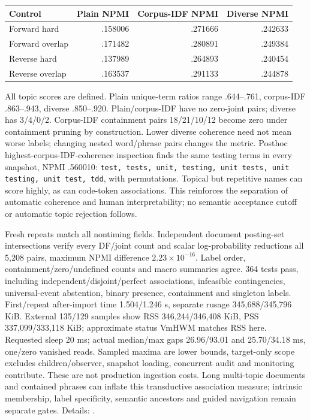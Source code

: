\documentclass[11pt]{article}
\begin{document}
\begin{center}\small
\begin{tabular}{lrrr}
\toprule
Control & Plain NPMI & Corpus-IDF NPMI & Diverse NPMI\\
\midrule
Forward hard & .158006 & .271666 & .242633\\
Forward overlap & .171482 & .280891 & .249384\\
Reverse hard & .137989 & .264893 & .240454\\
Reverse overlap & .163537 & .291133 & .244878\\
\bottomrule
\end{tabular}\end{center}
All topic scores are defined. Plain unique-term ratios range .644--.761,
corpus-IDF .863--.943, diverse .850--.920. Plain/corpus-IDF have no zero-joint
pairs; diverse has 3/4/0/2. Corpus-IDF containment pairs 18/21/10/12 become
zero under containment pruning by construction. Lower diverse coherence need
not mean worse labels; changing nested word/phrase pairs changes the metric.
Posthoc highest-corpus-IDF-coherence inspection finds the same testing terms
in every snapshot, NPMI .560010: \texttt{test, tests, unit, testing, unit tests,
unit testing, unit test, tdd}, with permutations. Topical but repetitive names
can score highly, as can code-token associations. This reinforces the separation
of automatic coherence and human interpretability\cite{hoyle}; no semantic
acceptance cutoff or automatic topic rejection follows.

Fresh repeats match all nontiming fields. Independent document posting-set
intersections verify every DF/joint count and scalar log-probability reductions
all 5,208 pairs, maximum NPMI difference $2.23\times10^{-16}$. Label order,
containment/zero/undefined counts and macro summaries agree. 364 tests pass,
including independent/disjoint/perfect associations, infeasible contingencies,
universal-event abstention, binary presence, containment and singleton labels.
First/repeat after-import time 1.504/1.246 s, separate rusage 345,688/345,796 KiB.
External 135/129 samples show RSS 346,244/346,408 KiB, PSS 337,099/333,118 KiB;
approximate status VmHWM matches RSS here. Requested sleep 20 ms; actual median/max
gaps 26.96/93.01 and 25.70/34.18 ms, one/zero vanished reads. Sampled maxima are
lower bounds, target-only scope excludes children/observer, snapshot loading,
concurrent audit and monitoring contribute. These are not production ingestion
costs. Long multi-topic documents and contained phrases can inflate this
transductive association measure; intrinsic membership, label specificity,
semantic ancestors and guided navigation remain separate gates. Details:
.
\end{document}
